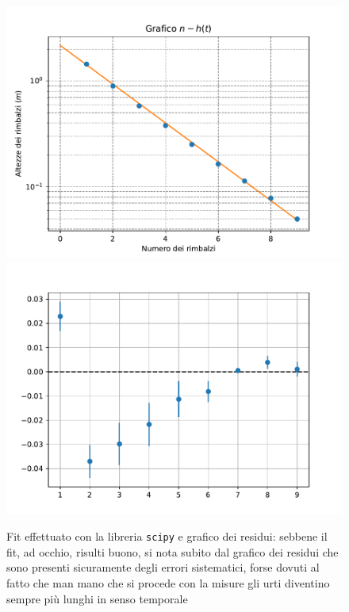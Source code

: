 \documentclass{article}
\begin{document}
\begin{figure}
	\centering
	\includegraphics[scale=0.4]{Grafico_n-h(t).pdf} 
	\includegraphics[scale=0.4]{Grafico_residui.pdf}
	\caption{Fit effettuato con la libreria \texttt{scipy} e grafico dei residui: sebbene il fit, ad occhio, risulti buono, si nota subito dal grafico dei residui che sono presenti sicuramente degli errori sistematici, forse dovuti al fatto che man mano che si procede con la misure gli urti diventino sempre più lunghi in senso temporale}
	\vspace{1cm}
\end{figure}
\end{document}
